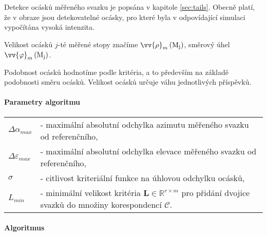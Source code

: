 	Detekce ocásků měřeného svazku je popsána v kapitole \ref{sec:tails}. Obecně platí, že v obraze jsou detekovatelné ocásky, pro které byla v odpovídající simulaci vypočítána vysoká intenzita. 
	
	Velikost ocásků $j$-té měřené stopy značíme $\vv{\rho}_{m}\left(\mathrm{M_j}\right)$, směrový úhel $\vv{\varphi}_{m}\left(\mathrm{M_j}\right)$. 
	 
	 Podobnost ocásků hodnotíme podle kritéria, a to především na základě podobnosti směru ocásků. Velikost ocásků určuje váhu jednotlivých příspěvků.
	 
\paragraph{Parametry algoritmu}
\hspace{1mm}
	 
	 \begin{tabular}{l l}
	 $\Delta\alpha_{max}$ & - maximální absolutní odchylka azimutu měřeného svazku od referenčního,\\
	 $\Delta\varepsilon_{max}$ & - maximální absolutní odchylka elevace měřeného svazku od referenčního,\\
	 $\sigma$ & - citlivost kriteriální funkce na úhlovou odchylku ocásků,\\
	 $L_{min}$ &  - minimální velikost kritéria  $\mathbf{L} \in \mathbb{R}^{r\times m}$ pro přidání dvojice svazků do množiny korespondencí $\mathcal{C}$. \\
	 \end{tabular}
	
\paragraph{Algoritmus}

